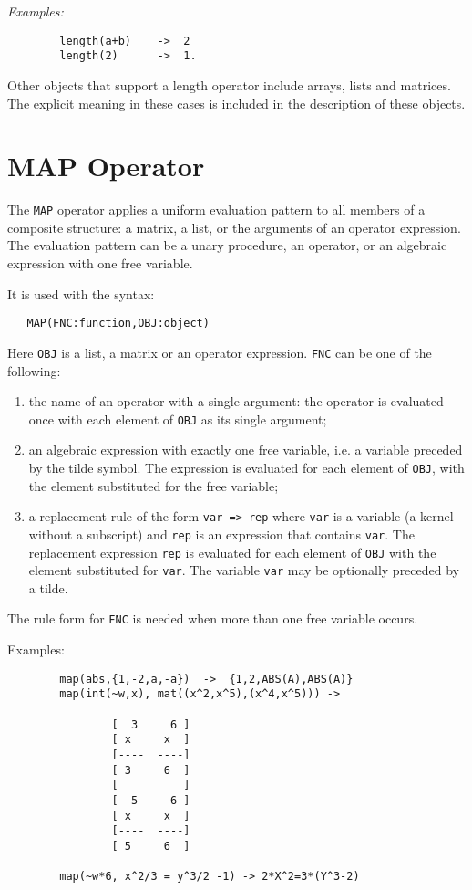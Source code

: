 \textit{Examples:}
\begin{verbatim}
        length(a+b)    ->  2
        length(2)      ->  1.
\end{verbatim}
Other objects that support a length operator include arrays, lists and
matrices. The explicit meaning in these cases is included in the description
of these objects.

\section{MAP Operator}
\hypertarget{operator:MAP}{}

The \texttt{MAP} operator applies a uniform evaluation pattern to all members
of a composite structure: a matrix, a list, or the arguments of an
operator expression.  The evaluation pattern can be a unary procedure, an
operator, or an algebraic expression with one free variable.

It is used with the syntax:
\begin{verbatim}
   MAP(FNC:function,OBJ:object)
\end{verbatim}
Here \texttt{OBJ} is a list, a matrix or an operator expression.
\texttt{FNC} can be one of the following:
\begin{enumerate}
\item the name of an operator with a single argument: the operator
is evaluated once with each element of \texttt{OBJ} as its single argument;
\item an algebraic expression with exactly one free variable, i.e.
a variable preceded by the tilde symbol. The expression
is evaluated for each element of \texttt{OBJ}, with the element
substituted for the free variable;
\item a replacement rule of the form \texttt{var => rep}
where \texttt{var} is a variable (a kernel without a subscript)
and \texttt{rep} is an expression that contains \texttt{var}.
The replacement expression \texttt{rep} is evaluated for each element of
\texttt{OBJ} with
the element substituted for  \texttt{var}. The variable \texttt{var} may be
optionally preceded by a tilde.
\end{enumerate}
The rule form  for \texttt{FNC} is needed when more than
one free variable occurs.

Examples:
\begin{verbatim}
        map(abs,{1,-2,a,-a})  ->  {1,2,ABS(A),ABS(A)}
        map(int(~w,x), mat((x^2,x^5),(x^4,x^5))) ->

                [  3     6 ]
                [ x     x  ]
                [----  ----]
                [ 3     6  ]
                [          ]
                [  5     6 ]
                [ x     x  ]
                [----  ----]
                [ 5     6  ]

        map(~w*6, x^2/3 = y^3/2 -1) -> 2*X^2=3*(Y^3-2)
\end{verbatim}

